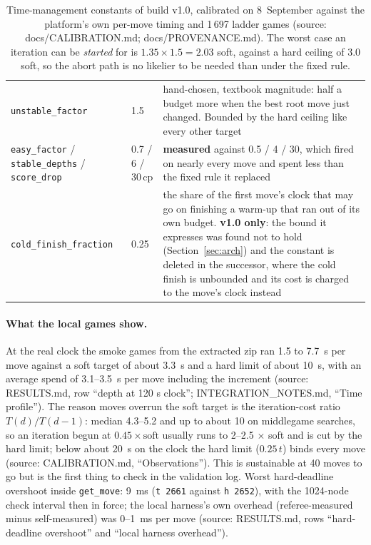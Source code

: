\documentclass[11pt,a4paper]{article}
\newcommand{\src}[1]{{\small(source: #1)}}
\newcommand{\code}[1]{\texttt{#1}}
\begin{document}
\begin{table}[H]
\begin{tabular}{@{}ll>{\raggedright\arraybackslash}p{7.6cm}@{}}
\code{unstable\_factor} & 1.5 & hand-chosen, textbook magnitude: half a budget more when the best root move just changed. Bounded by the hard ceiling like every other target \\
\code{easy\_factor} / \code{stable\_depths} / \code{score\_drop} & 0.7 / 6 / 30\,cp & \textbf{measured} against 0.5 / 4 / 30, which fired on nearly every move and spent less than the fixed rule it replaced \\
\code{cold\_finish\_fraction} & 0.25 & the share of the first move's clock that may go on finishing a warm-up that ran out of its own budget. \textbf{v1.0 only}: the bound it expresses was found not to hold (Section~\ref{sec:arch}) and the constant is deleted in the successor, where the cold finish is unbounded and its cost is charged to the move's clock instead \\
\bottomrule
\end{tabular}
\caption{Time-management constants of build v1.0, calibrated on 8~September against the platform's own
per-move timing and 1\,697 ladder games \src{docs/CALIBRATION.md; docs/PROVENANCE.md}. The worst case an
iteration can be \emph{started} for is $1.35 \times 1.5 = 2.03$ soft, against a hard ceiling of 3.0 soft,
so the abort path is no likelier to be needed than under the fixed rule.}
\end{table}

\paragraph{What the local games show.} At the real clock the smoke games from the extracted zip ran 1.5 to
7.7~s per move against a soft target of about 3.3~s and a hard limit of about 10~s, with an average spend
of 3.1--3.5~s per move including the increment \src{RESULTS.md, row ``depth at 120 s clock'';
INTEGRATION\_NOTES.md, ``Time profile''}. The reason moves overrun the soft target is the iteration-cost
ratio $T(d)/T(d-1)$: median 4.3--5.2 and up to about 10 on middlegame searches, so an iteration begun at
$0.45 \times \mathrm{soft}$ usually runs to 2--2.5 $\times$ soft and is cut by the hard limit; below
about 20~s on the clock the hard limit ($0.25\, t$) binds every move \src{CALIBRATION.md,
``Observations''}. This is sustainable at 40 moves to go but is the first thing to check in the validation
log. Worst hard-deadline overshoot inside \code{get\_move}: 9~ms (\code{t 2661} against \code{h 2652}),
with the 1024-node check interval then in force; the local harness's own overhead (referee-measured minus
self-measured) was 0--1~ms per move \src{RESULTS.md, rows ``hard-deadline overshoot'' and ``local harness
overhead''}.
\end{document}
